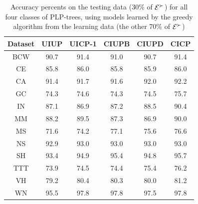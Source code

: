 {
	\begin{table}
	  \centering
	  \small
		\setlength\tabcolsep{6pt}
	  \begin{tabular}{ |c||c|c|c|c|c| }
	    \hline
	    Dataset          	 & UIUP & UICP-1 & CIUPB & CIUPD & CICP \\
	    \hline \hline                                             
	    BCW                & 90.7 & 91.4   & 91.0  & 90.7  & 91.4   \\ \hline
	    CE                 & 85.8 & 86.0   & 85.8  & 85.9  & 86.0   \\ \hline
	    CA                 & 91.4 & 91.7   & 91.6  & 92.0  & 92.2   \\ \hline
	    GC                 & 74.3 & 74.6   & 74.3  & 74.5  & 75.7   \\ \hline
	    IN                 & 87.1 & 86.9   & 87.2  & 88.5  & 90.4   \\ \hline
	    MM                 & 88.2 & 89.5   & 87.3  & 86.9  & 90.0   \\ \hline
	    MS                 & 71.6 & 74.2   & 77.1  & 75.6  & 76.6   \\ \hline
	    NS                 & 92.9 & 93.0   & 93.0  & 93.0  & 93.0   \\ \hline
	    SH                 & 93.4 & 94.9   & 95.4  & 94.8  & 95.7   \\ \hline
	    TTT                & 73.9 & 74.5   & 74.4  & 75.4  & 76.2   \\ \hline
	    VH                 & 79.2 & 80.4   & 80.3  & 80.0  & 81.2   \\ \hline
	    WN                 & 95.5 & 97.8   & 97.8  & 97.5  & 97.8   \\ \hline
	  \end{tabular}
	  \caption{Accuracy percents on the testing data (30\% of $\mathcal{E}^\succ$)
						 for all four classes of PLP-trees, using models learned
						 by the greedy algorithm from the learning 
						 data (the other 70\% of $\mathcal{E}^\succ$)}
	  \label{tbl:trees2}
	\end{table}
}

